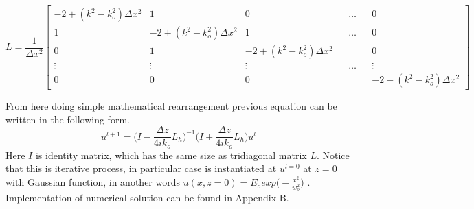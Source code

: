 \documentclass[a4paper]{article}
\begin{document}
	\setlength\arraycolsep{-4.5pt}
	\[ L = \frac{1}{\Delta x^2}\begin{bmatrix}
    -2+(k^2-k_o^2)\Delta x^2& 1& 0& &\dots& & 0 \\
    1 & -2+(k^2-k_o^2)\Delta x^2 & 1& &\dots& & 0 \\
    0 &     1& -2+(k^2-k_o^2)\Delta x^2 & & & & 0 \\
    \vdots & \vdots & \vdots & &\dots& & \vdots \\
    0& 0& 0& && &     -2+(k^2-k_o^2)\Delta x^2
	\end{bmatrix}\]
	
	
	\noindent From here doing simple mathematical rearrangement previous equation can be written in the following form.
		\[u^{l+1} = \bigg(I-\frac{\Delta z}{4ik_o}L_h\bigg)^{-1}\bigg(I+\frac{\Delta z}{4ik_o}L_h\bigg) u^l\]
	Here $I$ is identity matrix, which has the same size as tridiagonal matrix $L$. Notice that this is iterative process, in particular case is instantiated at $u^{l=0}$ at $z = 0$ with Gaussian function, in another words $u(x,z=0)= E_oexp\big(-\frac{x^2}{w_o^2}\big)$ \cite{pedrola2015beam, link2}. Implementation of numerical solution can be found in Appendix B.
	
\end{document}
